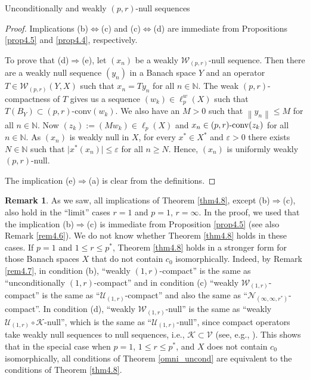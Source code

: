 \documentclass[a4paper,11pt]{amsart}
\theoremstyle{definition}
\newtheorem{rem}[prop]{Remark}
\theoremstyle{definition}
\theoremstyle{definition}
\begin{document}
\begin{section}{Unconditionally and weakly ${{(p,r)}}$-null sequences}
\begin{proof}
Implications (b)$\Leftrightarrow $(c) and (c)$\Leftrightarrow$(d) are immediate from Propositions \ref{prop4.5} and \ref{prop4.4}, respectively.

To prove that (d)$\Rightarrow $(e), let $(x_n)$ be a weakly ${{\mathcal W}}_{(p,r)}$-null sequence. Then there are a weakly null sequence $(y_n)$ in a Banach space $Y$ and an operator $T \in {{\mathcal W}}_{{(p,r)}} (Y,X)$ such that $x_n= Ty_n$ for all $n\in {{\mathbb N}}$. The weak ${{(p,r)}}$-compactness of $T$ gives us a sequence $(w_k) \in \ell_p^w(X)$ such that $T(B_Y)\subset {{(p,r)}}$-conv$(w_k)$. We also have an $M>0$ such that ${\left\lVert {y_n} \right\rVert} \leq M$ for all $n\in {{\mathbb N}}$. Now $(z_k):=(M w_k )\in \ell_p(X)$ and $x_n\in {{(p,r)}}\textnormal{-conv}(z_k)$ for all $n\in {{\mathbb N}}$. As $(x_n)$ is weakly null in $X$, for every ${x^{\ast}} \in{X^{\ast}}$ and ${\varepsilon}>0$ there exists $N\in {{\mathbb N}}$ such that $\vert {x^{\ast}}(x_n)\vert \leq {\varepsilon}$ for all $n\geq N$. Hence, $(x_n)$ is uniformly weakly ${{(p,r)}}$-null.

The implication (e)$\Rightarrow$(a) is clear from the definitions.
\end{proof}

\begin{rem}
As we saw, all implications of Theorem \ref{thm4.8}, except (b)$\Rightarrow $(c), also hold in the ``limit'' cases $r=1$ and $p=1$, $r=\infty$. In the proof, we used that the implication (b)$\Rightarrow $(c) is immediate from Proposition \ref{prop4.5} (see also Remark \ref{rem4.6}). We do not know whether Theorem \ref{thm4.8} holds in these cases. If $p=1$ and $1\leq r \leq {p^{\ast}}$, Theorem \ref{thm4.8} holds in a stronger form for those Banach spaces $X$ that do not contain $c_0$ isomorphically. Indeed, by Remark \ref{rem4.7}, in condition (b), ``weakly $(1,r)$-compact'' is the same as ``unconditionally $(1,r)$-compact'' and in condition (c) ``weakly ${{\mathcal W}}_{(1,r)}$-compact'' is the same as ``${{\mathcal U}}_{(1,r)}$-compact'' and also the same as ``${{\mathcal N}}_{(\infty, \infty, {r^{\ast}})}$-compact''. In condition (d), ``weakly ${{\mathcal W}}_{(1,r)}$-null'' is the same as ``weakly ${{\mathcal U}}_{(1,r)}\circ {{\mathcal K}}$-null'', which is the same as ``${{\mathcal U}}_{(1,r)}$-null'', since compact operators take weakly null sequences to null sequences, i.e., ${{\mathcal K}}\subset {{\mathcal V}}$ (see, e.g., \cite[1.11.4]{P}). This shows that in the special case when $p=1$, $1\leq r \leq {p^{\ast}}$, and $X$ does not contain $c_0$ isomorphically, all conditions of Theorem \ref{omni_uncond} are equivalent to the conditions of Theorem \ref{thm4.8}.
\end{rem}
\end{section}
\end{document}
